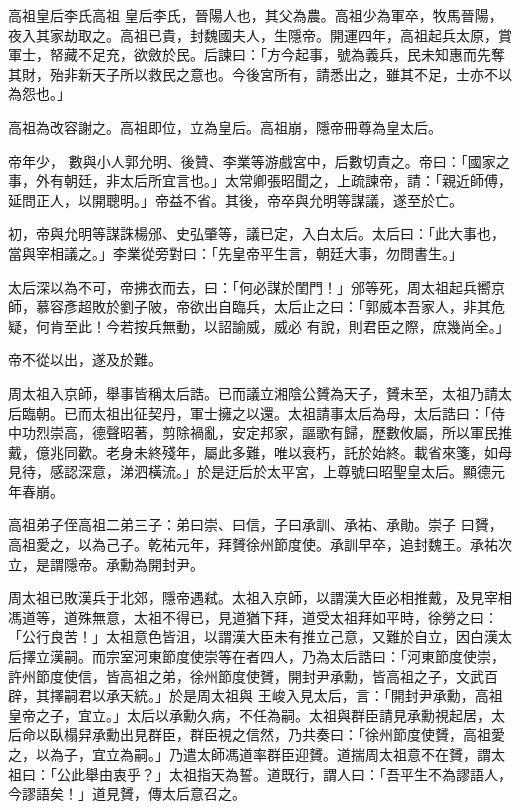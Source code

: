 
\begin{pinyinscope}

 高祖皇后李氏高祖
 皇后李氏，晉陽人也，其父為農。高祖少為軍卒，牧馬晉陽，夜入其家劫取之。高祖已貴，封魏國夫人，生隱帝。開運四年，高祖起兵太原，賞軍士，帑藏不足充，欲斂於民。后諫曰：「方今起事，號為義兵，民未知惠而先奪其財，殆非新天子所以救民之意也。今後宮所有，請悉出之，雖其不足，士亦不以為怨也。」



 高祖為改容謝之。高祖即位，立為皇后。高祖崩，隱帝冊尊為皇太后。



 帝年少，
 數與小人郭允明、後贊、李業等游戲宮中，后數切責之。帝曰：「國家之事，外有朝廷，非太后所宜言也。」太常卿張昭聞之，上疏諫帝，請：「親近師傅，延問正人，以開聰明。」帝益不省。其後，帝卒與允明等謀議，遂至於亡。



 初，帝與允明等謀誅楊邠、史弘肇等，議已定，入白太后。太后曰：「此大事也，當與宰相議之。」李業從旁對曰：「先皇帝平生言，朝廷大事，勿問書生。」



 太后深以為不可，帝拂衣而去，曰：「何必謀於閨門！」邠等死，周太祖起兵嚮京師，慕容彥超敗於劉子陂，帝欲出自臨兵，太后止之曰：「郭威本吾家人，非其危疑，何肯至此！今若按兵無動，以詔諭威，威必
 有說，則君臣之際，庶幾尚全。」



 帝不從以出，遂及於難。



 周太祖入京師，舉事皆稱太后誥。已而議立湘陰公贇為天子，贇未至，太祖乃請太后臨朝。已而太祖出征契丹，軍士擁之以還。太祖請事太后為母，太后誥曰：「侍中功烈崇高，德聲昭著，剪除禍亂，安定邦家，謳歌有歸，歷數攸屬，所以軍民推戴，億兆同歡。老身未終殘年，屬此多難，唯以衰朽，託於始終。載省來箋，如母見待，感認深意，涕泗橫流。」於是迂后於太平宮，上尊號曰昭聖皇太后。顯德元年春崩。



 高祖弟子侄高祖二弟三子：弟曰崇、曰信，子曰承訓、承祐、承勛。崇子
 曰贇，高祖愛之，以為己子。乾祐元年，拜贇徐州節度使。承訓早卒，追封魏王。承祐次立，是謂隱帝。承勳為開封尹。



 周太祖已敗漢兵于北郊，隱帝遇弒。太祖入京師，以謂漢大臣必相推戴，及見宰相馮道等，道殊無意，太祖不得已，見道猶下拜，道受太祖拜如平時，徐勞之曰：「公行良苦！」太祖意色皆沮，以謂漢大臣未有推立己意，又難於自立，因白漢太后擇立漢嗣。而宗室河東節度使崇等在者四人，乃為太后誥曰：「河東節度使崇，許州節度使信，皆高祖之弟，徐州節度使贇，開封尹承勳，皆高祖之子，文武百辟，其擇嗣君以承天統。」於是周太祖與
 王峻入見太后，言：「開封尹承勳，高祖皇帝之子，宜立。」太后以承勳久病，不任為嗣。太祖與群臣請見承勳視起居，太后命以臥榻舁承勳出見群臣，群臣視之信然，乃共奏曰：「徐州節度使贇，高祖愛之，以為子，宜立為嗣。」乃遣太師馮道率群臣迎贇。道揣周太祖意不在贇，謂太祖曰：「公此舉由衷乎？」太祖指天為誓。道既行，謂人曰：「吾平生不為謬語人，今謬語矣！」道見贇，傳太后意召之。




\end{pinyinscope}

